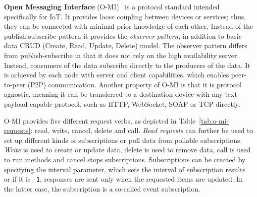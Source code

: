 
\textbf{Open Messaging Interface} (O-MI)~\cite{o-mi} is a protocol standard intended specifically for IoT. It provides loose coupling between devices or services; thus, they can be connected with minimal prior knowledge of each other. Instead of the publish-subscribe pattern it provides the \emph{observer pattern}, in addition to basic data CRUD (Create, Read, Update, Delete) model. The observer pattern differs from publish-subscribe in that it does not rely on the high availability server. Instead, consumers of the data subscribe directly to the producers of the data. It is achieved by each node with server and client capabilities, which enables peer-to-peer (P2P) communication. Another property of O-MI is that it is protocol agnostic, meaning it can be transferred to a destination device with any text payload capable protocol, such as HTTP, WebSocket, SOAP or TCP directly.

O-MI provides five different request verbs, as depicted in Table~\ref{tab:o-mi-requests}: read, write, cancel, delete and call. \emph{Read requests} can further be used to set up different kinds of subscriptions or poll data from pollable subscriptions. \emph{Write} is used to create or update data, delete is used to remove data, call is used to run methods and cancel stops subscriptions. Subscriptions can be created by specifying the interval parameter, which sets the interval of subscription results or if it is \verb+-1+, responses are sent only when the requested items are updated. In the latter case, the subscription is a so-called event subscription.


